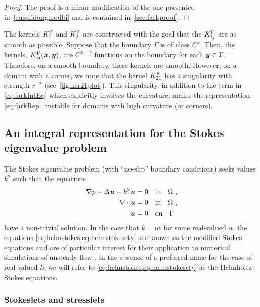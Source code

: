 \begin{proof}
  The proof is a minor modification of the one presented in~\ref{eq:shidongmodbi}
  and is contained in~\cref{sec:farkproof}.
\end{proof}

The kernels $K^{\textrm{F}}_1$ and $K^{\textrm{F}}_2$ are
constructed with the goal that the $K^{\textrm{F}}_{ij}$ are
as smooth as possible. Suppose that the boundary
$\Gamma$ is of class $C^k$. Then, the kernels,
$K^{\textrm{F}}_{ij}({\boldsymbol x},{\boldsymbol y})$, are $C^{k-2}$ functions on the boundary
for each ${\boldsymbol y} \in \Gamma$.
Therefore, on a smooth
boundary, these kernels are smooth. However, on a
domain with a corner, we note 
that the kernel $K^{\textrm{F}}_{21}$
has a singularity with strength $r^{-2}$ (see~\cref{fig:ker21plot}). 
This singularity, in addition to the term in \cref{eq:farkIntEq}
which explicitly involves the
curvature, makes the representation \cref{eq:farkRep}
unstable for domains with high curvature (or
corners).

\subsection{An integral representation for the Stokes eigenvalue
  problem}

The Stokes eigenvalue problem (with ``no-slip'' boundary conditions)
seeks values $k^2$ such that the equations
\begin{align}
  \nabla p - \Delta {\boldsymbol u} - k^2 {\boldsymbol u} &= 0 \quad \textrm{in} \quad \Omega
  \; , \label{eq:helmstokes}\\
  \nabla \cdot {\boldsymbol u} &= 0 \quad \textrm{in} \quad \Omega
  \; , \label{eq:helmstokescty} \\
  {\boldsymbol u} &= 0 \quad \textrm{on} \quad \Gamma \; \label{eq:helmstokesnoslip}
\end{align}
have a non-trivial solution. In the case that $k=i\alpha$ for
some real-valued $\alpha$, the equations \cref{eq:helmstokes,eq:helmstokescty}
are known as the modified Stokes equations and are of particular
interest for their application to numerical simulations of unsteady
flow
\cite{pozrikidis1992boundary,biros2002embedded,jiang2013second}.
In the absence of a preferred name for the case of real-valued $k$,
we will refer to \cref{eq:helmstokes,eq:helmstokescty} as the
Helmholtz-Stokes equations.



\subsubsection{Stokeslets and stresslets}

